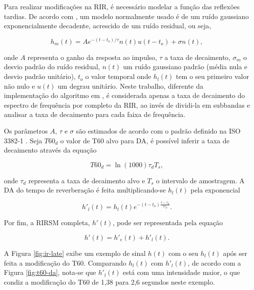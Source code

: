 Para realizar modificações na RIR, é necessário modelar a função das reflexões tardias. De acordo com \cite{RIR_Data_Aug},
um modelo normalmente usado é de um ruído gaussiano exponencialmente decadente, acrescido de um ruído residual, ou seja,

\begin{equation} \label{eqn:h_l-gauss}
    h_m(t) = A e^{-(t - t_o)/ \tau} n(t) u(t - t_o) + \sigma n(t)
    ,
\end{equation}

\noindent
onde $A$ representa o ganho da resposta ao impulso, $\tau$ a taxa de decaimento, $\sigma_m$ o desvio padrão do ruído residual, 
$n(t)$ um ruído gaussiano padrão (média nula e desvio padrão unitário), $t_o$ o valor temporal onde $h_l(t)$
tem o seu primeiro valor não nulo e $u(t)$ um degrau unitário.
Neste trabalho, diferente da implementação do algoritmo em \cite{RIR_Data_Aug}, é considerada apenas a taxa de decaimento
do espectro de frequência por completo da RIR, ao invés de dividi-la em subbandas e analisar 
a taxa de decaimento para cada faixa de frequência.

Os parâmetros $A$, $\tau$ e $\sigma$ são estimados de acordo com o padrão definido na ISO 3382-1 \cite{ISO-3382}.
Seja $T60_d$ o valor de T60 alvo para DA, é possível inferir a taxa de decaimento através da equação

\begin{equation} \label{eqn:decay-rate-t60}
    T60_d = \ln(1000) \tau_d T_s
    ,
\end{equation}

\noindent
onde $\tau_d$ representa a taxa de decaimento alvo e $T_s$ o intervalo de amostragem.
A DA do tempo de reverberação é feita multiplicando-se $h_l(t)$ pela exponencial

\begin{equation} \label{eqn:DA-T60}
    h'_l(t) = h_l(t) e^{-(t - t_o) \frac{\tau - \tau_d}{ \tau \tau_d} }
    .
\end{equation}

Por fim, a RIRSM completa, $h'(t)$, pode ser representada pela equação

\begin{equation} \label{eqn:RIRSM}
    h'(t) = h'_e(t) + h'_l(t)
    .
\end{equation}

A Figura \ref{fig:ir-late} exibe um exemplo de sinal $h(t)$ com o seu $h_l(t)$ após ser feita a modificação do T60.
Comparando $h_l(t)$ com $h'_l(t)$, de acordo com a Figura \ref{fig:t60-da}, nota-se que $h'_l(t)$  está com uma intensidade 
maior, o que condiz a modificação do T60 de 1,38 para 2,6 segundos neste exemplo.

